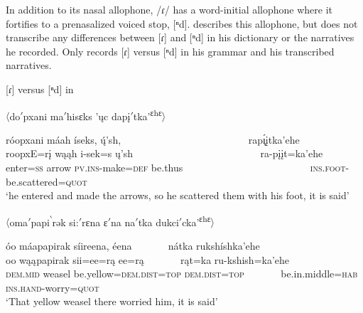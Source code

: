 In addition to its nasal allophone, /ɾ/ has a word-initial allophone where it fortifies to a prenasalized voiced stop, [ⁿd]. \citet[52]{hollow1970} describes this allophone, but does not transcribe any differences between [ɾ] and [ⁿd] in his dictionary or the narratives he recorded. Only \citet[3]{kennard1936} records [ɾ] versus [ⁿd] in his grammar and his transcribed narratives.

\begin{exe}

\item\label{prenasalizedR} [ɾ] versus [ⁿd] in \citet{kennard1936}

	\begin{xlist}

	\item\label{prenasalizedR1} $\langle$do$'$pxani ma$'$hisɛks 'ųc dapį$'$tka'\textsuperscript{ɛhɛ}$\rangle$

	\glll róopxani máah íseks, ų́'sh, ~ ~ ~ ~ ~ ~ ~ ~ ~ ~ ~ ~ ~ ~ ~ rap\'{ı̨}įtka'ehe\\
		roopxE=rį wąąh i-sek=s ų'sh ~ ~ ~ ~ ~ ~ ~ ~ ~ ~ ~ ~ ~ ~ ~ ra-pįįt=ka'ehe\\
		\textnormal{enter}=\textsc{ss} \textnormal{arrow} \textsc{pv.ins}-\textnormal{make}=\textsc{def} \textnormal{be.thus} ~ ~ ~ ~ ~ ~ ~ ~ ~ ~ ~ ~ ~ ~ ~ \textsc{ins.foot}-\textnormal{be.scattered}=\textsc{quot}\\
		\glt `he entered and made the arrows, so he scattered them with his foot, it is said' \citep[38]{kennard1936}

	\item\label{prenasalizedR2} $\langle$oma$'$papi\textsuperscript{$\backprime$}rək  si:$'$rɛna ɛ$'$na na$'$tka dukci$'$cka'\textsuperscript{ɛhɛ}$\rangle$

	\glll óo máapapirak síireena, éena ~ ~ ~ ~ nátka rukshíshka'ehe\\
		oo wąąpapirak sii=ee=rą ee=rą ~ ~ ~ ~ rąt=ka ru-kshish=ka'ehe\\
		\textsc{dem.mid} \textnormal{weasel} \textnormal{be.yellow}=\textsc{dem.dist=top} \textsc{dem.dist=top} ~ ~ ~ ~ \textnormal{be.in.middle}=\textsc{hab} \textsc{ins.hand}-\textnormal{worry}=\textsc{quot}\\
		\glt `That yellow weasel there worried him, it is said' \citep[38]{kennard1936}

	\end{xlist}

\end{exe}


